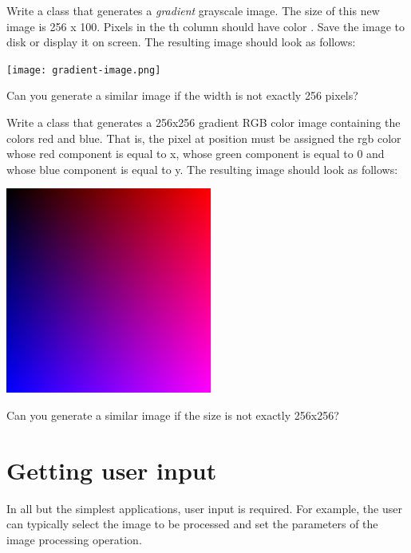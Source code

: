 \documentclass{book}
\begin{document}
\begin{exercise}\label{ex:gradient-image}
Write a class  that generates a \emph{gradient} grayscale image. The size of this new image is 256 x 100. Pixels in the th column should have color . Save the image to disk or display it on screen. The resulting image should look as follows:

\begin{center}
\texttt{[image: gradient-image.png]}
\end{center}

Can you generate a similar image if the width is not exactly 256 pixels?
\end{exercise}

\begin{exercise}
Write a class  that generates a 256x256 gradient RGB color image containing the colors red and blue. That is, the pixel at position  must be assigned the rgb color whose red component is equal to x, whose green component is equal to 0 and whose blue component is equal to y. The resulting image should look as follows:

\begin{center}
\includegraphics[scale=0.3]{rgb-gradient.png}
\end{center}

Can you generate a similar image if the size is not exactly 256x256?
\end{exercise}

\section{Getting user input}
In all but the simplest applications, user input is required. For example, the user can typically select the image to be processed and set the parameters of the image processing operation.
\end{document}
